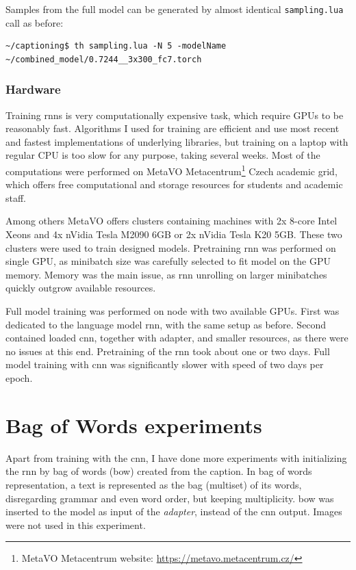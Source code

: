 Samples from the full model can be generated by almost identical \texttt{sampling.lua} call as before:

\hspace{1cm}
\begin{lstlisting}[firstnumber=1,breakindent=75pt,frame=single]
~/captioning$ th sampling.lua -N 5 -modelName ~/combined_model/0.7244__3x300_fc7.torch
\end{lstlisting}
\hspace{1cm}

\subsubsection{Hardware}

Training \gls{rnn}s is very computationally expensive task, which require GPUs to be reasonably fast. Algorithms I used for training are efficient and use most recent and fastest implementations of underlying libraries, but training on a laptop with regular CPU is too slow for any purpose, taking several weeks. Most of the computations were performed on MetaVO Metacentrum\footnote{MetaVO Metacentrum website: \url{https://metavo.metacentrum.cz/}} Czech academic grid, which offers free computational and storage resources for students and academic staff. 

Among others MetaVO offers clusters containing machines with 2x 8-core Intel Xeons and 4x nVidia Tesla M2090 6GB or 2x nVidia Tesla K20 5GB. These two clusters were used to train designed models. Pretraining \gls{rnn} was performed on single GPU, as minibatch size was carefully selected to fit model on the GPU memory. Memory was the main issue, as \gls{rnn} unrolling on larger minibatches quickly outgrow available resources.

Full model training was performed on node with two available GPUs. First was dedicated to the language model \gls{rnn}, with the same setup as before. Second contained loaded \gls{cnn}, together with adapter, and smaller resources, as there were no issues at this end. Pretraining of the \gls{rnn} took about one or two days. Full model training with \gls{cnn} was significantly slower with speed of two days per epoch.

\section{Bag of Words experiments}

Apart from training with the \gls{cnn}, I have done more experiments with initializing the \gls{rnn} by bag of words (\gls{bow}) created from the caption. In bag of words representation, a text is represented as the bag (multiset) of its words, disregarding grammar and even word order, but keeping multiplicity. \gls{bow} was inserted to the model as input of the \emph{adapter}, instead of the \gls{cnn} output. Images were not used in this experiment.


